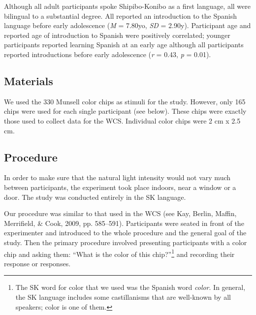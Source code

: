 \documentclass[floatsintext,man]{apa6}
\theoremstyle{definition}
\theoremstyle{definition}
\theoremstyle{definition}
\theoremstyle{remark}
\begin{document}
Although all adult participants spoke Shipibo-Konibo as a first
language, all were bilingual to a substantial degree. All reported an
introduction to the Spanish language before early adolescence (\emph{M}
= 7.80yo, \emph{SD} = 2.90y). Participant age and reported age of
introduction to Spanish were positively correlated; younger participants
reported learning Spanish at an early age although all participants
reported introductions before early adolescence (\emph{r} = 0.43,
\emph{p} = 0.01).

\subsection{Materials}\label{materials}

We used the 330 Munsell color chips as stimuli for the study. However,
only 165 chips were used for each single participant (see below). These
chips were exactly those used to collect data for the WCS. Individual
color chips were 2 cm x 2.5 cm.

\subsection{Procedure}\label{procedure}

In order to make sure that the natural light intensity would not vary
much between participants, the experiment took place indoors, near a
window or a door. The study was conducted entirely in the SK language.

Our procedure was similar to that used in the WCS (see Kay, Berlin,
Maffin, Merrifield, \& Cook, 2009, pp. 585--591). Participants were
seated in front of the experimenter and introduced to the whole
procedure and the general goal of the study. Then the primary procedure
involved presenting participants with a color chip and asking them:
\enquote{What is the color of this chip?}\footnote{The SK word for color
  that we used was the Spanish word \emph{color}. In general, the SK
  language includes some castillanisms that are well-known by all
  speakers; color is one of them.} and recording their response or
responses.
\end{document}
